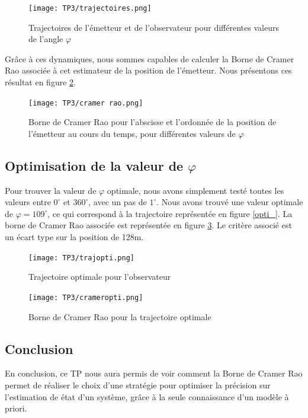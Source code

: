 \documentclass{article}
\begin{document}
 \begin{figure}[h!]
  \centering
  \texttt{[image: TP3/trajectoires.png]}
  \label{trajec}
  \caption{Trajectoires de l'émetteur et de l'observateur pour différentes valeurs de l'angle $\varphi$}
\end{figure}

Grâce à ces dynamiques, nous sommes capables de calculer la Borne de Cramer Rao associée à cet estimateur de la position de l'émetteur. 
Nous présentons ces résultat en figure \ref{cramerrao}. 

\begin{figure}[h!]
  \centering
  \texttt{[image: TP3/cramer rao.png]}
  \caption{Borne de Cramer Rao pour l'abscisse et l'ordonnée de la position de l'émetteur au cours du temps, pour différentes valeurs de $\varphi$}
  \label{cramerrao}
\end{figure}

\subsection{Optimisation de la valeur de $\varphi$}
Pour trouver la valeur de $\varphi$ optimale, nous avons simplement testé toutes les valeurs entre $0^{\circ}$ et $360^{\circ}$, avec un pas de 
$1^{\circ}$. Nous avons trouvé une valeur optimale de $\varphi = 109^{\circ}$, ce qui correspond à la trajectoire représentée en figure
\ref{opti_}. La borne de Cramer Rao associée est représentée en figure \ref{crameropti}. Le critère associé est un écart type sur la position de 128m.

\begin{figure}[h!]
   \centering
   \begin{minipage}[t]{8cm}
       \centering
       \texttt{[image: TP3/trajopti.png]}
       \caption{Trajectoire optimale pour l'observateur}
       \label{opti_}
   \end{minipage}
   \begin{minipage}[t]{8cm}
       \centering
       \texttt{[image: TP3/crameropti.png]}
       \caption{Borne de Cramer Rao pour la trajectoire optimale}
       \label{crameropti}
   \end{minipage}
\end{figure}

\subsection{Conclusion}
En conclusion, ce TP nous aura permis de voir comment la Borne de Cramer Rao permet de réaliser le choix d'une stratégie pour 
optimiser la précision sur l'estimation de état d'un système, grâce à la seule connaissance d'un modèle à priori.
\end{document}
